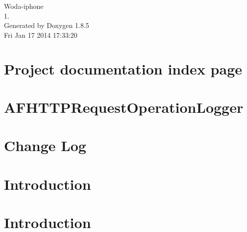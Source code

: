 \documentclass[twoside]{book}
\newcommand{\clearemptydoublepage}{%
  \newpage{\pagestyle{empty}\cleardoublepage}%
}
\begin{document}
\hypersetup{pageanchor=false}
\begin{titlepage}
\vspace*{7cm}
\begin{center}%
{\Large Woda-\/iphone \\[1ex]\large 1. }\\
\vspace*{1cm}
{\large Generated by Doxygen 1.8.5}\\
\vspace*{0.5cm}
{\small Fri Jan 17 2014 17:33:20}\\
\end{center}
\end{titlepage}
\clearemptydoublepage
\tableofcontents
\clearemptydoublepage
{}
\hypersetup{pageanchor=true}

\chapter{Project documentation index page}
\label{index}\hypertarget{index}{}
\chapter{A\-F\-H\-T\-T\-P\-Request\-Operation\-Logger}
\label{md__sources__librairies__a_f_h_t_t_p_request_operation_logger__r_e_a_d_m_e}
\hypertarget{md__sources__librairies__a_f_h_t_t_p_request_operation_logger__r_e_a_d_m_e}{}

\chapter{Change Log}
\label{md__sources__librairies_appirater__c_h_a_n_g_e_l_o_g}
\hypertarget{md__sources__librairies_appirater__c_h_a_n_g_e_l_o_g}{}

\chapter{Introduction}
\label{md__sources__librairies_appirater__r_e_a_d_m_e}
\hypertarget{md__sources__librairies_appirater__r_e_a_d_m_e}{}

\chapter{Introduction}
\label{md__sources__librairies__test_flight_s_d_k__r_e_a_d_m_e}
\hypertarget{md__sources__librairies__test_flight_s_d_k__r_e_a_d_m_e}{}

\end{document}
